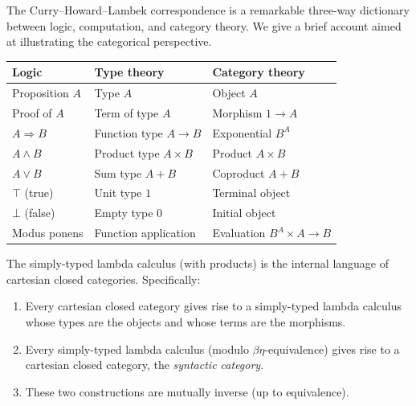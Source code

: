 
The Curry--Howard--Lambek correspondence is a remarkable three-way
dictionary between logic, computation, and category theory.  We give a
brief account aimed at illustrating the categorical perspective.

\begin{center}
\renewcommand{\arraystretch}{1.3}
\begin{tabular}{lll}
\hline
\textbf{Logic} & \textbf{Type theory} & \textbf{Category theory} \\
\hline
Proposition $A$ & Type $A$ & Object $A$ \\
Proof of $A$ & Term of type $A$ & Morphism $1\to A$ \\
$A\Rightarrow B$ & Function type $A\to B$ & Exponential $B^A$ \\
$A\wedge B$ & Product type $A\times B$ & Product $A\times B$ \\
$A\vee B$ & Sum type $A + B$ & Coproduct $A + B$ \\
$\top$ (true) & Unit type $1$ & Terminal object \\
$\bot$ (false) & Empty type $0$ & Initial object \\
Modus ponens & Function application & Evaluation $B^A\times A\to B$ \\
\hline
\end{tabular}
\end{center}

\begin{theorem}[Lambek]\label{thm:lambek}
The simply-typed lambda calculus (with products) is the internal language
of cartesian closed categories.  Specifically:
\begin{enumerate}[label=(\alph*)]
\item Every cartesian closed category gives rise to a simply-typed
      lambda calculus whose types are the objects and whose terms are
      the morphisms.
\item Every simply-typed lambda calculus (modulo $\beta\eta$-equivalence)
      gives rise to a cartesian closed category, the \emph{syntactic category}.
\item These two constructions are mutually inverse (up to equivalence).
\end{enumerate}
\end{theorem}

